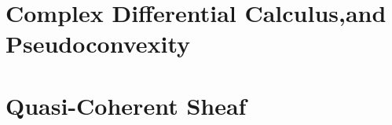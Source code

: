 \documentclass[Total.tex]{subfiles}
\begin{document}
	\chapter{Complex Differential Calculus,and Pseudoconvexity}
	\chapter{Quasi-Coherent Sheaf}
\end{document}
